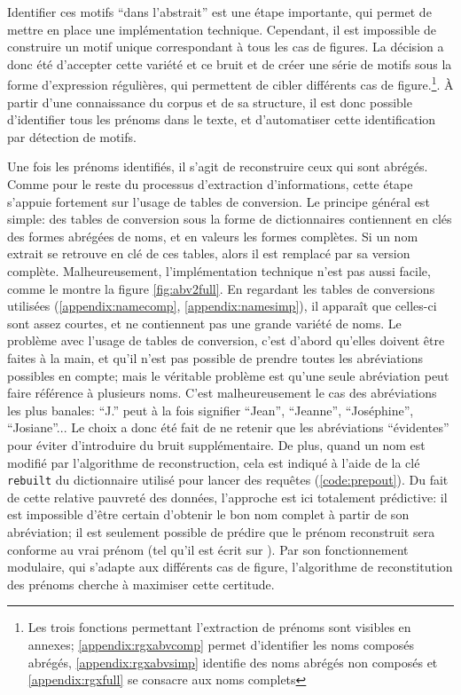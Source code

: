 Identifier ces motifs \enquote{dans l'abstrait} est une étape importante, qui permet de mettre en place une implémentation technique. Cependant, il est impossible de construire un motif unique correspondant à tous les cas de figures. La décision a donc été d'accepter cette variété et ce bruit et de créer une série de motifs sous la forme d'\glspl{expression régulière}, qui permettent de cibler différents cas de figure.\footnote{Les trois fonctions permettant l'extraction de prénoms sont visibles en annexes; \ref{appendix:rgxabvcomp} permet d'identifier les noms composés abrégés, \ref{appendix:rgxabvsimp} identifie des noms abrégés non composés et \ref{appendix:rgxfull} se consacre aux noms complets}. À partir d'une connaissance du corpus et de sa structure, il est donc possible d'identifier tous les prénoms dans le texte, et d'automatiser cette identification par détection de motifs.

Une fois les prénoms identifiés, il s'agit de reconstruire ceux qui sont abrégés. Comme pour le reste du processus d'extraction d'informations, cette étape s'appuie fortement sur l'usage de tables de conversion. Le principe général est simple: des tables de conversion sous la forme de \glspl{dictionnaire} contiennent en clés des formes abrégées de noms, et en valeurs les formes complètes. Si un nom extrait se retrouve en clé de ces tables, alors il est remplacé par sa version complète. Malheureusement, l'implémentation technique n'est pas aussi facile, comme le montre la figure \ref{fig:abv2full}. En regardant les tables de conversions utilisées (\ref{appendix:namecomp}, \ref{appendix:namesimp}), il apparaît que celles-ci sont assez courtes, et ne contiennent pas une grande variété de noms. Le problème avec l'usage de tables de conversion, c'est d'abord qu'elles doivent être faites à la main, et qu'il n'est pas possible de prendre toutes les abréviations possibles en compte; mais le véritable problème est qu'une seule abréviation peut faire référence à plusieurs noms. C'est malheureusement le cas des abréviations les plus banales: \enquote{J.} peut à la fois signifier \enquote{Jean}, \enquote{Jeanne}, \enquote{Joséphine}, \enquote{Josiane}...  Le choix a donc été fait de ne retenir que les abréviations \enquote{évidentes} pour éviter d'introduire du bruit supplémentaire. De plus, quand un nom est modifié par l'algorithme de reconstruction, cela est indiqué à l'aide de la clé \texttt{rebuilt} du dictionnaire utilisé pour lancer des requêtes (\ref{code:prepout}). Du fait de cette relative pauvreté des données, l'approche est ici totalement prédictive: il est impossible d'être certain d'obtenir le bon nom complet à partir de son abréviation; il est seulement possible de prédire que le prénom reconstruit sera conforme au vrai prénom (tel qu'il est écrit sur \wkd{}). Par son fonctionnement modulaire, qui s'adapte aux différents cas de figure, l'algorithme de reconstitution des prénoms cherche à maximiser cette certitude.

